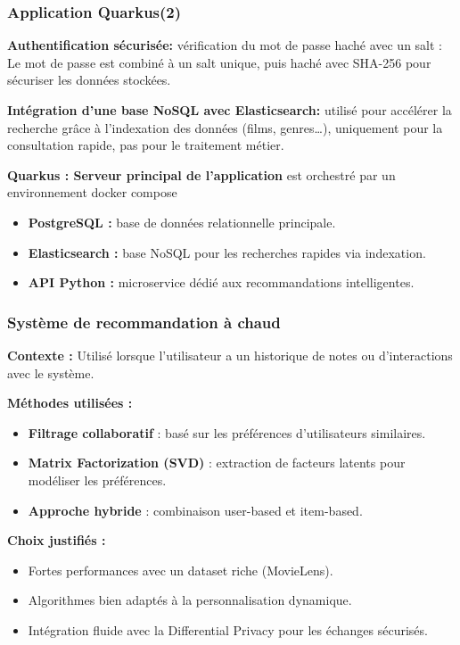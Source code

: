 \documentclass{beamer}
\begin{document}
    \begin{frame}
        \scriptsize
        \frametitle{Application Quarkus(2)}
        \textbf{Authentification sécurisée: }vérification du mot de passe haché avec un salt : Le mot de passe est combiné à un salt unique, puis haché avec SHA-256 pour sécuriser les données stockées.

        \textbf{Intégration d’une base NoSQL avec Elasticsearch: } utilisé pour accélérer la recherche grâce à l’indexation des données (films, genres…), uniquement pour la consultation rapide, pas pour le traitement métier.

        \textbf{Quarkus : Serveur principal de l’application} est orchestré par un environnement docker compose
        \begin{itemize}
            \item \textbf{PostgreSQL :} base de données relationnelle principale.
            \item \textbf{Elasticsearch :} base NoSQL pour les recherches rapides via indexation.
            \item \textbf{API Python :} microservice dédié aux recommandations intelligentes.


        \end{itemize}

    \end{frame}
    \begin{frame}
        \scriptsize
        \frametitle{Système de recommandation à chaud}
        \textbf{Contexte :} Utilisé lorsque l’utilisateur a un historique de notes ou d’interactions avec le système.

        \vspace{0.3cm}
        \textbf{Méthodes utilisées :}
        \begin{itemize}
            \item \textbf{Filtrage collaboratif} : basé sur les préférences d’utilisateurs similaires.
            \item \textbf{Matrix Factorization (SVD)} : extraction de facteurs latents pour modéliser les préférences.
            \item \textbf{Approche hybride} : combinaison user-based et item-based.
        \end{itemize}

        \vspace{0.3cm}
        \textbf{Choix justifiés :}
        \begin{itemize}
            \item Fortes performances avec un dataset riche (MovieLens).
            \item Algorithmes bien adaptés à la personnalisation dynamique.
            \item Intégration fluide avec la Differential Privacy pour les échanges sécurisés.
        \end{itemize}
    \end{frame}
\end{document}
